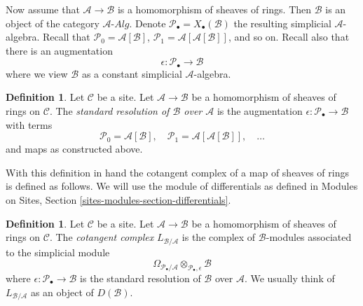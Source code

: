 \documentclass{stacks-project}
\theoremstyle{plain}
\theoremstyle{definition}
\newtheorem{definition}[subsection]{Definition}
\theoremstyle{remark}
\numberwithin{equation}{subsection}
\begin{document}
\medskip\noindent
Now assume that $\mathcal{A} \to \mathcal{B}$ is a homomorphism of sheaves
of rings. Then $\mathcal{B}$ is an object of the category
$\mathcal{A}\textit{-Alg}$. Denote
$\mathcal{P}_\bullet = X_\bullet(\mathcal{B})$ the resulting
simplicial $\mathcal{A}$-algebra.
Recall that
$\mathcal{P}_0 = \mathcal{A}[\mathcal{B}]$,
$\mathcal{P}_1 = \mathcal{A}[\mathcal{A}[\mathcal{B}]]$, and so on.
Recall also that there is an augmentation
$$
\epsilon : \mathcal{P}_\bullet \longrightarrow \mathcal{B}
$$
where we view $\mathcal{B}$ as a constant simplicial $\mathcal{A}$-algebra.

\begin{definition}
\label{definition-standard-resolution-sheaves-rings}
Let $\mathcal{C}$ be a site.
Let $\mathcal{A} \to \mathcal{B}$ be a homomorphism of sheaves of rings
on $\mathcal{C}$. The {\it standard resolution of $\mathcal{B}$ over
$\mathcal{A}$} is the augmentation
$\epsilon : \mathcal{P}_\bullet \to \mathcal{B}$
with terms
$$
\mathcal{P}_0 = \mathcal{A}[\mathcal{B}],\quad
\mathcal{P}_1 = \mathcal{A}[\mathcal{A}[\mathcal{B}]],\quad \ldots
$$
and maps as constructed above.
\end{definition}

\noindent
With this definition in hand the cotangent complex of a map of sheaves
of rings is defined as follows.
We will use the module of differentials as defined in
Modules on Sites, Section \ref{sites-modules-section-differentials}.

\begin{definition}
\label{definition-cotangent-complex-morphism-sheaves-rings}
Let $\mathcal{C}$ be a site.
Let $\mathcal{A} \to \mathcal{B}$ be a homomorphism of sheaves of rings
on $\mathcal{C}$.
The {\it cotangent complex} $L_{\mathcal{B}/\mathcal{A}}$
is the complex of $\mathcal{B}$-modules associated to the
simplicial module
$$
\Omega_{\mathcal{P}_\bullet/\mathcal{A}}
\otimes_{\mathcal{P}_\bullet, \epsilon} \mathcal{B}
$$
where $\epsilon : \mathcal{P}_\bullet \to \mathcal{B}$
is the standard resolution of $\mathcal{B}$ over
$\mathcal{A}$. We usually think of $L_{\mathcal{B}/\mathcal{A}}$
as an object of $D(\mathcal{B})$.
\end{definition}
\end{document}
